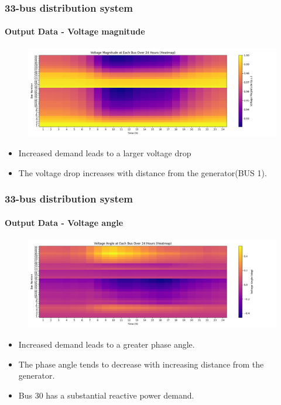 \documentclass[
	11pt, %
	aspectratio=169, %
]{beamer}
\begin{document}


\begin{frame}
	\frametitle{33-bus distribution system}
	\framesubtitle{Output Data - Voltage magnitude}

	\begin{figure}
		\includegraphics[width=5 in,keepaspectratio]{../fig/V_mag_heatmap.png}
	\end{figure}

	\begin{itemize}
		\item Increased demand leads to a larger voltage drop
		\item The voltage drop increases with distance from the generator(BUS 1).
	\end{itemize}

	
\end{frame}


\begin{frame}
	\frametitle{33-bus distribution system}
	\framesubtitle{Output Data - Voltage angle}

	\begin{figure}
		\includegraphics[width=5 in,keepaspectratio]{../fig/V_ang_heatmap.png}
	\end{figure}

		\begin{itemize}
		\item Increased demand leads to a greater phase angle.
		\item The phase angle tends to decrease with increasing distance from the generator.
		\item Bus 30 has a substantial reactive power demand.
	\end{itemize}

	
\end{frame}
\end{document}
